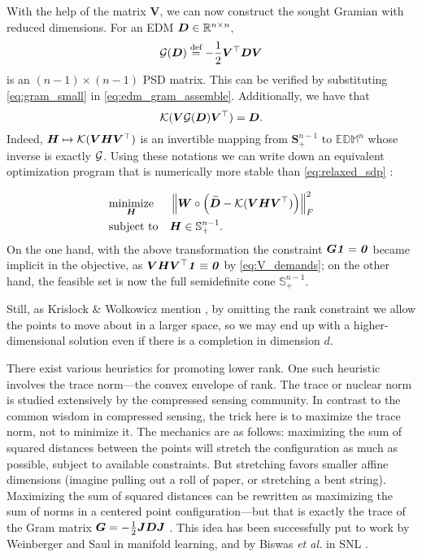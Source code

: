 \documentclass[10pt,double]{IEEEtran}
\providecommand{\R}{\ensuremath{\mathbb{R}}}
\renewcommand{\S}{\ensuremath{\mathbb{S}}}
\providecommand{\norm}[1]{\left\lVert#1\right\rVert}
\providecommand{\bydef}{\overset{\text{def}}{=}}
\renewcommand{\vec}[1]{\ensuremath{\boldsymbol{#1}}}
\providecommand{\mat}[1]{\ensuremath{\boldsymbol{#1}}}
\providecommand{\wt}[1]{\ensuremath{\widetilde{#1}}}
\providecommand{\mS}{\mat{S}} \providecommand{\mU}{\mat{U}}
\providecommand{\mV}{\mat{V}} \providecommand{\mT}{\mat{T}}
\providecommand{\mW}{\mat{W}}
\newcommand{\EDMset}{\ensuremath{\mathbb{EDM}}}
\newcommand{\EDMgram}{\ensuremath{\mathcal{K}}}
\newcommand{\GramSmall}{\ensuremath{\mathcal{G}}}
\newcommand{\vone}{\ensuremath{\vec{\mathit{1}}}}
\renewcommand{\vzero}{\ensuremath{\vec{\mathit{0}}}}
\newcommand{\T}{\ensuremath{\top}}
\newcommand{\rev}[1]{{#1}}
\begin{document}
\rev{With the help of the matrix $\mV$, we can now construct the sought Gramian
with reduced dimensions.} For an EDM $\mD \in \R^{n \times n}$,
\begin{equation}
	\label{eq:gram_small}
	\GramSmall(\mD) \bydef -\frac{1}{2}\mV^\T \mD \mV
\end{equation} is an $(n-1) \times (n-1)$ PSD matrix. This
can be verified by substituting \eqref{eq:gram_small} in
\eqref{eq:edm_gram_assemble}. Additionally, we have that
\begin{equation}
\EDMgram(\mV \GramSmall(\mD) \mV^\T) = \mD.
\end{equation}
Indeed,  $\mH \mapsto \EDMgram(\mV \mH \mV^\T)$ is an invertible mapping from
$\mS_{+}^{n-1}$ to $\EDMset^n$ whose inverse is exactly $\mathcal{\mG}$. Using
these notations we can write down an equivalent optimization program that is
numerically more stable than \eqref{eq:relaxed_sdp} \cite{Alfakih1999}:

\begin{equation}
\label{eq:relaxed_sdp_schoenberg}
\begin{aligned}
& \underset{\mH}{\text{minimize}}
& & \norm{\mW \circ \left(\wt{\mD} - \EDMgram(\mV \mH \mV^\T)\right)}_F^2 \\
& \text{subject to}
& & \mH \in \S^{n-1}_+.
\end{aligned}
\end{equation}
On the one hand, with the above transformation the constraint $\mG
\vone = \vzero$ became implicit in the objective, as $\mV \mH \mV^\T \vone
\equiv \vzero$ by \eqref{eq:V_demands}; on the other hand, the feasible set is
now the full semidefinite cone $\S_+^{n-1}$.

Still, as Krislock \& Wolkowicz mention \cite{Krislock:2012xx}, by omitting
the rank constraint we allow the points to move about in a larger space, so we
may end up with a higher-dimensional solution even if there is a completion in
dimension $d$.

There exist various heuristics for promoting lower rank. One such heuristic
involves the trace norm---the convex envelope of rank. The trace or nuclear
norm is studied extensively by the compressed sensing community. In contrast
to the common wisdom in compressed sensing, the trick here is to maximize the
trace norm, not to minimize it. The mechanics are as follows: maximizing the
sum of squared distances between the points will stretch the configuration as
much as possible, subject to available constraints. But stretching favors
smaller affine dimensions (imagine pulling out a roll of paper, or stretching
a bent string). Maximizing the sum of squared distances can be rewritten as
maximizing the sum of norms in a centered point configuration---but that is
exactly the trace of the Gram matrix $\mG = -\frac{1}{2}
\mJ \mD \mJ$ \cite{Weinberger2004}. This idea has been successfully put to
work by Weinberger and Saul \cite{Weinberger2004} in manifold learning, and by
Biswas \emph{et al.} in SNL \cite{Biswas:2006cm}.
\end{document}
